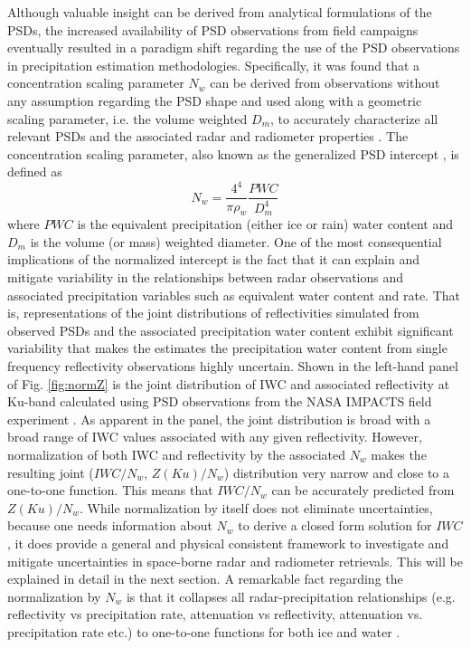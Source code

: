 \documentclass[10pt]{ietbook}
\begin{document}
Although valuable insight can be derived from analytical formulations of the PSDs, the increased availability of PSD observations from field
campaigns eventually resulted in a paradigm shift regarding the use of the PSD observations in precipitation estimation methodologies.  Specifically,
it was found that a concentration scaling parameter $N_w$ can be derived from observations without any assumption regarding the PSD shape 
and used along with a geometric scaling parameter, i.e.
the volume weighted $D_m$, to accurately characterize all relevant PSDs and the associated radar and radiometer properties \cite{norm_dsd_2001}.  
The concentration scaling
parameter, also known as the generalized PSD intercept \cite{bringi2003}, is defined as
\begin{equation} \label{eq:nw}
    N_w=\frac {4^4} {\pi \rho_w} \frac {PWC} {D_m^4}
\end{equation}
where $PWC$ is the equivalent precipitation (either ice or rain) water content and $D_m$ is the volume (or mass) weighted diameter.  One of
the most consequential implications of the normalized intercept is the fact that it can explain and mitigate variability in the relationships between
radar observations and associated precipitation variables such as equivalent water content and rate.  
That is, representations of the joint distributions of reflectivities simulated from 
observed PSDs and the associated precipitation water content exhibit significant variability that makes the estimates the precipitation water content
from single frequency reflectivity observations highly uncertain.  Shown in the left-hand panel of Fig. \ref{fig:normZ} is the joint distribution of 
IWC and associated reflectivity at Ku-band calculated using PSD observations from the NASA IMPACTS field experiment \cite{impacts2022}.  As apparent 
in the panel, the joint distribution is broad with a broad range of IWC values associated with any given reflectivity.  However, normalization of 
both IWC and reflectivity by the associated $N_w$ makes the resulting joint ($IWC/N_w$, $Z(Ku)/N_w$) distribution very narrow and close to a one-to-one function.
This means that $IWC/N_w$ can be accurately predicted from $Z(Ku)/N_w$.  While normalization by itself does not eliminate uncertainties, because one
needs information about $N_w$ to derive a closed form solution for $IWC$, it does provide a general and physical consistent 
framework to investigate and mitigate uncertainties in space-borne radar and radiometer retrievals.  This will be explained in detail in the next 
section.  A remarkable fact regarding the normalization by $N_w$ is that it collapses all radar-precipitation relationships (e.g. reflectivity vs precipitation
rate, attenuation vs reflectivity, attenuation vs. precipitation rate etc.) to one-to-one functions for both ice and water \cite{ferreira2001}.
\end{document}
